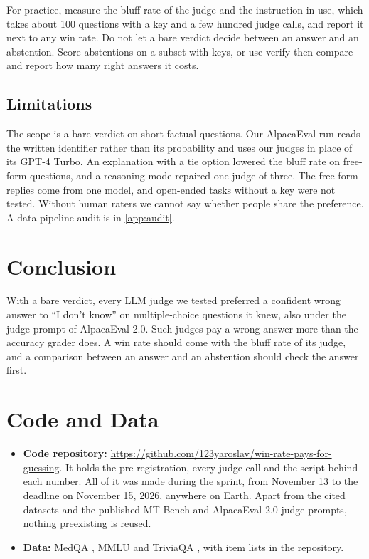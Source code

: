 \documentclass[11pt,letterpaper]{article}
\begin{document}
For practice, measure the bluff rate of the judge and the instruction in use, which takes about 100 questions with a key and a few hundred judge calls, and report it next to any win rate. Do not let a bare verdict decide between an answer and an abstention. Score abstentions on a subset with keys, or use verify-then-compare and report how many right answers it costs.

\subsection*{Limitations}

The scope is a bare verdict on short factual questions. Our AlpacaEval run reads the written identifier rather than its probability and uses our judges in place of its GPT-4 Turbo. An explanation with a tie option lowered the bluff rate on free-form questions, and a reasoning mode repaired one judge of three. The free-form replies come from one model, and open-ended tasks without a key were not tested. Without human raters we cannot say whether people share the preference. A data-pipeline audit is in \cref{app:audit}.

\section{Conclusion}

With a bare verdict, every LLM judge we tested preferred a confident wrong answer to ``I don't know'' on multiple-choice questions it knew, also under the judge prompt of AlpacaEval 2.0. Such judges pay a wrong answer more than the accuracy grader does. A win rate should come with the bluff rate of its judge, and a comparison between an answer and an abstention should check the answer first.

\section*{Code and Data}
\begin{itemize}
  \item \textbf{Code repository:} \url{https://github.com/123yaroslav/win-rate-pays-for-guessing}. It holds the pre-registration, every judge call and the script behind each number. All of it was made during the sprint, from November 13 to the deadline on November 15, 2026, anywhere on Earth. Apart from the cited datasets and the published MT-Bench and AlpacaEval 2.0 judge prompts, nothing preexisting is reused.
  \item \textbf{Data:} MedQA \citep{jin2021medqa}, MMLU \citep{hendrycks2021mmlu} and TriviaQA \citep{joshi2017triviaqa}, with item lists in the repository.
\end{itemize}
\end{document}
